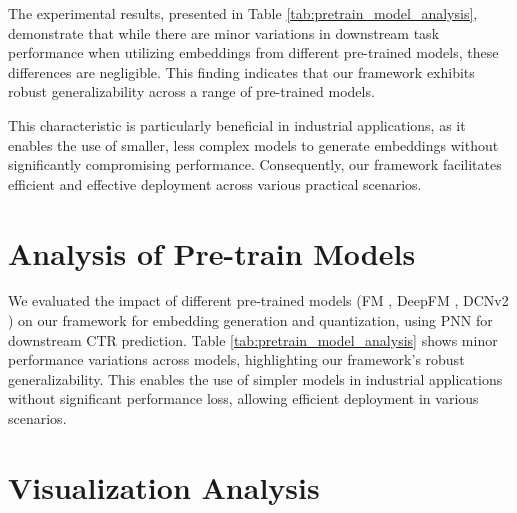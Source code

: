     The experimental results, presented in Table \ref{tab:pretrain_model_analysis}, demonstrate that while there are minor variations in downstream task performance when utilizing embeddings from different pre-trained models, these differences are negligible. This finding indicates that our framework exhibits robust generalizability across a range of pre-trained models.
    
    This characteristic is particularly beneficial in industrial applications, as it enables the use of smaller, less complex models to generate embeddings without significantly compromising performance. Consequently, our framework facilitates efficient and effective deployment across various practical scenarios.

\section{\textbf{Analysis of Pre-train Models}}

We evaluated the impact of different pre-trained models (FM \cite{FM}, DeepFM \cite{DeepFM}, DCNv2 \cite{DCNv2}) on our framework for embedding generation and quantization, using PNN for downstream CTR prediction. Table \ref{tab:pretrain_model_analysis} shows minor performance variations across models, highlighting our framework's robust generalizability. This enables the use of simpler models in industrial applications without significant performance loss, allowing efficient deployment in various scenarios.



\section{Visualization Analysis}
\label{app:visual}

